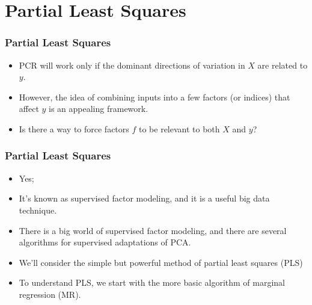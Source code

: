 \documentclass[
  shownotes,
  xcolor={svgnames},
  hyperref={colorlinks,citecolor=DarkBlue,linkcolor=DarkRed,urlcolor=DarkBlue}
  , aspectratio=169]{beamer}
\begin{document}
\section{Partial Least Squares }
\begin{frame}[fragile]
\frametitle{Partial Least Squares }

\begin{itemize}

\item  PCR will work only if the dominant directions of variation in $X$ are related to $y$.
\medskip
\item  However, the idea of combining inputs into a few factors (or indices) that affect $y$ is an appealing framework. 
\medskip
\item Is there a way to force factors $f$ to be relevant to both $X$ and $y$? 
\end{itemize}

\end{frame}
\begin{frame}[fragile]
\frametitle{Partial Least Squares }

\begin{itemize}
\item Yes; 
\medskip
\pause
\item It's known as supervised factor modeling, and it is a useful big data technique. 
\medskip
\item There is a big world of supervised factor modeling, and there are several algorithms for supervised adaptations of PCA.
\medskip
\item  We’ll consider the simple but powerful method of partial least squares (PLS)

\medskip
\item  To understand PLS, we start with the more basic algorithm of marginal regression (MR).
\end{itemize}

\end{frame}
\end{document}
